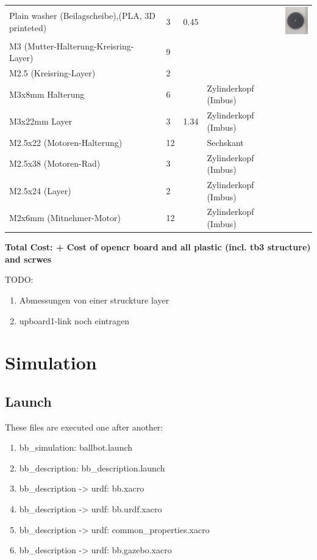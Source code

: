 \documentclass[twoside,colorback,accentcolor=tud4c,11pt]{tudreport}
\begin{document}
\begin{tabular}{l l l l l}
	Plain washer (Beilagscheibe),(PLA, 3D printeted)&3&0.45 & &
	\includegraphics[height=0.06\textwidth]{img/beilagscheibe.png}  \\
	
	M3  (Mutter-Halterung-Kreisring-Layer)&9& & & \\
	M2.5  (Kreisring-Layer)&2& & & \\
	M3x8mm Halterung &6& &Zylinderkopf (Imbus) & \\
	M3x22mm Layer&3&1.34 &Zylinderkopf (Imbus) & \\
	M2.5x22 (Motoren-Halterung) &12&&Sechskant & \\
	M2.5x38 (Motoren-Rad)&3& &Zylinderkopf (Imbus) & \\
	M2.5x24 (Layer)&2& &Zylinderkopf (Imbus) & \\
	M2x6mm  (Mitnehmer-Motor)&12 & &Zylinderkopf (Imbus) & \\
	
\end{tabular}

\textbf{Total Cost:  + Cost of opencr board and all plastic (incl. tb3 structure) and scrwes }

TODO:\\
\begin{enumerate}
	\item Abmessungen von einer struckture layer
	\item upboard1-link noch eintragen
\end{enumerate}

\chapter{Simulation}

\section{Launch}
These files are executed one after another:
\begin{enumerate}
	\item bb\_simulation: ballbot.launch
	\item bb\_description: bb\_description.launch
	\item bb\_description -> urdf: bb.xacro
	\item bb\_description -> urdf: bb.urdf.xacro
	\item bb\_description -> urdf: common\_properties.xacro
	\item bb\_description -> urdf: bb.gazebo.xacro
\end{enumerate}
\end{document}
